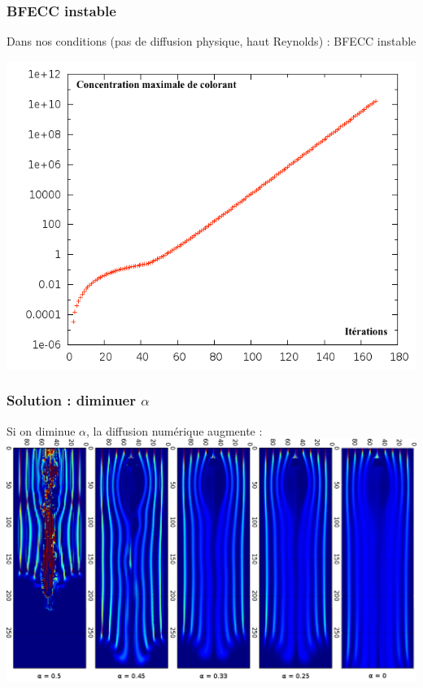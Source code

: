\documentclass{beamer}
\begin{document}
  \begin{frame}
    \frametitle{BFECC instable}
    Dans nos conditions (pas de diffusion physique, haut Reynolds)
    : BFECC instable
    \begin{center}
      \includegraphics[height=0.8\textheight]{instab_BFECC.png}
    \end{center}
  \end{frame}
  \begin{frame}
    \frametitle{Solution : diminuer $\alpha$}
    Si on diminue $\alpha$, la diffusion numérique augmente :
    \centering \includegraphics[width=1.\textwidth]{comparaison_alpha.png}
  \end{frame}
  
\end{document}
